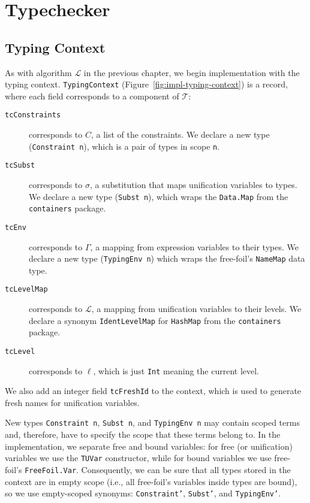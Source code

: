 \section{Typechecker}

\subsection{Typing Context}

As with algorithm $\mathcal{L}$ in the previous chapter, we begin implementation with the typing context. \texttt{TypingContext} (Figure~\ref{fig:impl-typing-context}) is a record, where each field corresponds to a component of $\mathcal{T}$:

\begin{description}
  \item[\texttt{tcConstraints}] corresponds to $C$, a list of the constraints. We declare a new type (\texttt{Constraint n}), which is a pair of types in scope \texttt{n}.
  \item[\texttt{tcSubst}] corresponds to $\sigma$, a substitution that maps unification variables to types. We declare a new type (\texttt{Subst n}), which wraps the \texttt{Data.Map} from the \texttt{containers} package.
  \item[\texttt{tcEnv}] corresponds to $\Gamma$, a mapping from expression variables to their types. We declare a new type (\texttt{TypingEnv n}) which wraps the free-foil's \texttt{NameMap} data type.
  \item[\texttt{tcLevelMap}] corresponds to $\mathcal{L}$, a mapping from unification variables to their levels. We declare a synonym \texttt{IdentLevelMap} for \texttt{HashMap} from the \texttt{containers} package.
  \item[\texttt{tcLevel}] corresponds to $\ell$, which is just \texttt{Int} meaning the current level.
\end{description}

We also add an integer field \texttt{tcFreshId} to the context, which is used to generate fresh names for unification variables.

New types \texttt{Constraint n}, \texttt{Subst n}, and \texttt{TypingEnv n} may contain scoped terms and, therefore, have to specify the scope that these terms belong to. In the implementation, we separate free and bound variables: for free (or unification) variables we use the \texttt{TUVar} constructor, while for bound variables we use free-foil's \texttt{FreeFoil.Var}. Consequently, we can be sure that all types stored in the context are in empty scope (i.e., all free-foil's variables inside types are bound), so we use empty-scoped synonyms: \texttt{Constraint'}, \texttt{Subst'}, and \texttt{TypingEnv'}.

